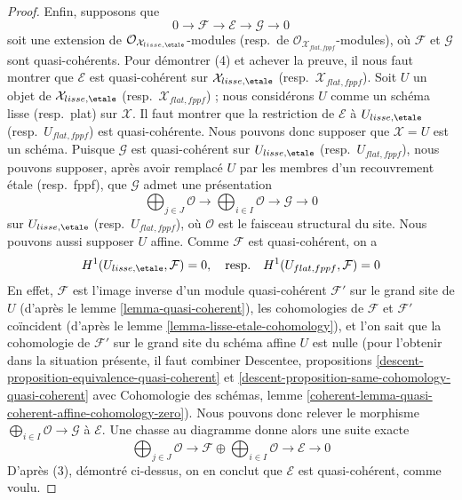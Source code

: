 \begin{proof}
\medskip\noindent
Enfin, supposons que
$$
0 \to \mathcal{F} \to \mathcal{E} \to \mathcal{G} \to 0
$$
soit une extension de $\mathcal{O}_{\mathcal{X}_{lisse,\etale}}$-modules
(resp.\ de $\mathcal{O}_{\mathcal{X}_{flat,fppf}}$-modules), où $\mathcal{F}$
et $\mathcal{G}$ sont quasi-cohérents. Pour démontrer (4) et achever la preuve,
il nous faut montrer que
$\mathcal{E}$ est quasi-cohérent sur $\mathcal{X}_{lisse,\etale}$
(resp.\ $\mathcal{X}_{flat,fppf}$). Soit $U$
un objet de $\mathcal{X}_{lisse,\etale}$
(resp.\ $\mathcal{X}_{flat,fppf}$) ; nous considérons $U$ comme un schéma lisse
(resp.\ plat) sur $\mathcal{X}$. Il faut montrer que la restriction
de $\mathcal{E}$ à $U_{lisse,\etale}$ (resp.\ $U_{flat,fppf}$)
est quasi-cohérente. Nous pouvons donc supposer
que $\mathcal{X} = U$ est un schéma. Puisque $\mathcal{G}$
est quasi-cohérent sur $U_{lisse,\etale}$ (resp.\ $U_{flat,fppf}$),
nous pouvons supposer, après avoir remplacé $U$ par les membres
d'un recouvrement étale (resp.\ fppf), que $\mathcal{G}$ admet une
présentation
$$
\bigoplus\nolimits_{j \in J} \mathcal{O} \longrightarrow
\bigoplus\nolimits_{i \in I} \mathcal{O} \longrightarrow
\mathcal{G} \longrightarrow 0
$$
sur $U_{lisse,\etale}$ (resp.\ $U_{flat,fppf}$), où $\mathcal{O}$
est le faisceau structural du site. Nous pouvons aussi supposer $U$ affine.
Comme $\mathcal{F}$ est quasi-cohérent, on a
$$
H^1(U_{lisse,\etale}, \mathcal{F}) = 0,
\quad\text{resp.}\quad
H^1(U_{flat,fppf}, \mathcal{F}) = 0
$$
En effet, $\mathcal{F}$ est l'image inverse d'un module quasi-cohérent
$\mathcal{F}'$ sur le grand site de $U$
(d'après le lemme \ref{lemma-quasi-coherent}), les cohomologies
de $\mathcal{F}$ et $\mathcal{F}'$ coïncident (d'après le
lemme \ref{lemma-lisse-etale-cohomology}), et l'on sait que
la cohomologie de $\mathcal{F}'$ sur le grand site du schéma affine $U$
est nulle (pour l'obtenir dans la situation présente, il faut
combiner Descentee, propositions
\ref{descent-proposition-equivalence-quasi-coherent} et
\ref{descent-proposition-same-cohomology-quasi-coherent} avec
Cohomologie des schémas, lemme
\ref{coherent-lemma-quasi-coherent-affine-cohomology-zero}).
Nous pouvons donc relever le morphisme
$\bigoplus_{i \in I} \mathcal{O} \to \mathcal{G}$
à $\mathcal{E}$. Une chasse au diagramme donne alors
une suite exacte
$$
\bigoplus\nolimits_{j \in J} \mathcal{O} \to
\mathcal{F} \oplus \bigoplus\nolimits_{i \in I} \mathcal{O}
\to
\mathcal{E} \to 0
$$
D'après (3), démontré ci-dessus, on en conclut que $\mathcal{E}$ est
quasi-cohérent, comme voulu.
\end{proof}









